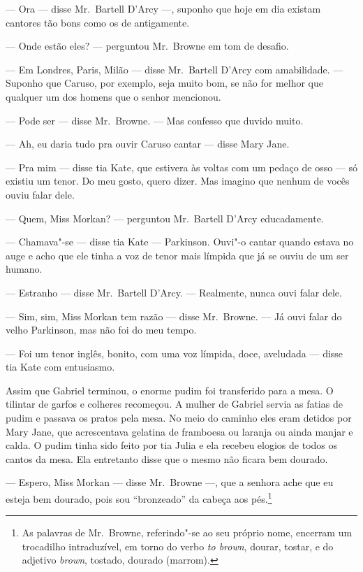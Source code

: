 --- Ora --- disse Mr.~Bartell D’Arcy ---, suponho que hoje em dia existam
cantores tão bons como os de antigamente.

--- Onde estão eles? --- perguntou Mr.~Browne em tom de desafio.

--- Em Londres, Paris, Milão --- disse Mr.~Bartell D’Arcy com amabilidade.  ---
Suponho que Caruso, por exemplo, seja muito bom, se não for melhor que qualquer
um dos homens que o senhor mencionou.

--- Pode ser --- disse Mr.~Browne.  --- Mas confesso que duvido muito.

--- Ah, eu daria tudo pra ouvir Caruso cantar --- disse Mary Jane.

--- Pra mim --- disse tia Kate, que estivera às voltas com um pedaço de osso
--- só existiu um tenor.  Do meu gosto, quero dizer.  Mas imagino que nenhum de
vocês ouviu falar dele.

--- Quem, Miss Morkan? --- perguntou Mr.~Bartell D’Arcy educadamente.

--- Chamava"-se --- disse tia Kate --- Parkinson.  Ouvi"-o cantar quando estava
no auge e acho que ele tinha a voz de tenor mais límpida que já se ouviu de um
ser humano.

--- Estranho --- disse Mr.~Bartell D’Arcy.  --- Realmente, nunca ouvi falar
dele.

--- Sim, sim, Miss Morkan tem razão --- disse Mr.~Browne.  --- Já ouvi falar do
velho Parkinson, mas não foi do meu tempo.

--- Foi um tenor inglês, bonito, com uma voz límpida, doce, aveludada --- disse
tia Kate com entusiasmo.

Assim que Gabriel terminou, o enorme pudim foi transferido para a mesa.  O
tilintar de garfos e colheres recomeçou.  A mulher de Gabriel servia as fatias
de pudim e passava os pratos pela mesa.  No meio do caminho eles eram detidos
por Mary Jane, que acrescentava gelatina de framboesa ou laranja ou ainda
manjar e calda.  O pudim tinha sido feito por tia Julia e ela recebeu elogios
de todos os cantos da mesa.  Ela entretanto disse que o mesmo não ficara bem
dourado.

--- Espero, Miss Morkan --- disse Mr.~Browne ---, que a senhora ache que eu
esteja bem dourado, pois sou “bronzeado” da cabeça aos pés.\footnote{ As
palavras de Mr.~Browne, referindo"-se ao seu próprio nome, encerram um
trocadilho intraduzível, em torno do verbo \textit{to brown}, dourar, tostar, e
do adjetivo \textit{brown}, tostado, dourado (marrom).}

